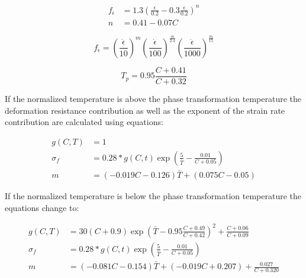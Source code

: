 \documentclass[11pt]{PyRollDocs}
\begin{document}
    \begin{equation}
        \begin{aligned}
            f_{\epsilon} &= 1.3 \left( \frac{\epsilon}{0.2} - 0.3 \frac{\epsilon}{0.2} \right)^n \\
            n &= 0.41-0.07 C
        \end{aligned}
        \label{eq:strain-contribution}
    \end{equation}

    \begin{equation}
        f_{\dot{\epsilon}} = \left( \frac{\dot{\epsilon}}{10} \right)^m \left( \frac{\dot{\epsilon}}{100} \right)^{\frac{m}{2.4}} \left( \frac{\dot{\epsilon}}{1000} \right)^{\frac{m}{15}}
        \label{eq:strain-rate-contribution}
    \end{equation}

    \begin{equation}
        T_p = 0.95 \frac{C + 0.41}{C+ 0.32}
        \label{eq:phase-transformation-temperature}
    \end{equation}

    If the normalized temperature is above the phase transformation temperature the deformation resistance contribution as well as the exponent of the strain rate contribution are calculated using equations:

    \begin{equation}
        \begin{aligned}
            g(C,T) &= 1 \\
            \sigma_f &= 0.28 * g(C,t) \exp \left( \frac{5}{\bar{T}} - \frac{0.01}{C + 0.05} \right) \\
            m &= (-0.019C - 0.126)\bar{T} + (0.075C-0.05)
        \end{aligned}
        \label{eq:above-phase-transformation}
    \end{equation}

    If the normalized temperature is below the phase transformation temperature the equations change to:

    \begin{equation}
        \begin{aligned}
            g(C,T) &= 30 ( C +0.9) \exp \left( \bar{T} - 0.95 \frac{C + 0.49}{C +0.42} \right)^2 + \frac{C + 0.06}{C + 0.09} \\
            \sigma_f &= 0.28 * g(C,t) \exp \left( \frac{5}{\bar{T}} - \frac{0.01}{C + 0.05} \right) \\
            m &= (-0.081 C - 0.154) \bar{T} + (-0.019 C + 0.207) + \frac{0.027}{C+0.320}
        \end{aligned}
        \label{eq:below-phase-transformation}
    \end{equation}
\end{document}
